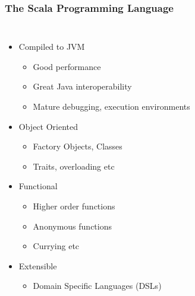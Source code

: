 \documentclass[xcolor=pdflatex,dvipsnames,table]{beamer}
\begin{document}
\begin{frame}[fragile]
\frametitle{The Scala Programming Language}

\begin{columns}[c]


\begin{itemize}
\item Compiled to JVM
\begin{itemize}
\item Good performance
\item Great Java interoperability
\item Mature debugging, execution environments
\end{itemize}
\item Object Oriented
\begin{itemize}
\item Factory Objects, Classes
\item Traits, overloading etc
\end{itemize}
\item Functional
\begin{itemize}
\item Higher order functions
\item Anonymous functions
\item Currying etc
\end{itemize}
\item Extensible
\begin{itemize}
\item Domain Specific Languages (DSLs)
\end{itemize}
\end{itemize}



\end{columns}
\end{frame}
\end{document}
